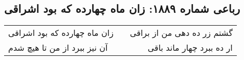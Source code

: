 \begin{center}
\section*{رباعی شماره ۱۸۸۹: زان ماه چهارده که بود اشراقی}
\label{sec:1889}
\begin{longtable}{l p{0.5cm} r}
زان ماه چهارده که بود اشراقی
&&
گشتم زر ده دهی من از براقی
\\
آن نیز ببرد از من تا هیچ شدم
&&
ار ده ببرد چهار ماند باقی
\\
\end{longtable}
\end{center}
